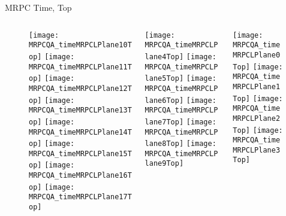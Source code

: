 \documentclass[11pt]{beamer}
\begin{document}
\begin{frame}{MRPC Time, Top}
  \begin{figure}
    \begin{columns}
      \begin{column}{.33\textheight}
        \texttt{[image: MRPCQA\_timeMRPCLPlane10Top]}
        \texttt{[image: MRPCQA\_timeMRPCLPlane11Top]}
        \texttt{[image: MRPCQA\_timeMRPCLPlane12Top]}
        \texttt{[image: MRPCQA\_timeMRPCLPlane13Top]}
        \texttt{[image: MRPCQA\_timeMRPCLPlane14Top]}
        \texttt{[image: MRPCQA\_timeMRPCLPlane15Top]}
        \texttt{[image: MRPCQA\_timeMRPCLPlane16Top]}
        \texttt{[image: MRPCQA\_timeMRPCLPlane17Top]}
      \end{column}
      \begin{column}{.33\textheight}
        \texttt{[image: MRPCQA\_timeMRPCLPlane4Top]}
        \texttt{[image: MRPCQA\_timeMRPCLPlane5Top]}
        \texttt{[image: MRPCQA\_timeMRPCLPlane6Top]}
        \texttt{[image: MRPCQA\_timeMRPCLPlane7Top]}
        \texttt{[image: MRPCQA\_timeMRPCLPlane8Top]}
        \texttt{[image: MRPCQA\_timeMRPCLPlane9Top]}
      \end{column}
      \begin{column}{.33\textheight}
        \texttt{[image: MRPCQA\_timeMRPCLPlane0Top]}
        \texttt{[image: MRPCQA\_timeMRPCLPlane1Top]}
        \texttt{[image: MRPCQA\_timeMRPCLPlane2Top]}
        \texttt{[image: MRPCQA\_timeMRPCLPlane3Top]}
      \end{column}
    \end{columns}
  \end{figure}
\end{frame}
\end{document}
